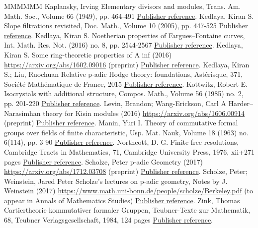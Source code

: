 \begin{thebibliography}{MMMMMM}
 Kaplansky, Irving Elementary divisors and modules, Trans. Am. Math. Soc., Volume 66 (1949), pp. 464-491 \href{https://ahl.centre-mersenne.org/item/AHL_2019__2__415_0/#Ka66}{Publisher reference}.
 Kedlaya, Kiran S. Slope filtrations revisited, Doc. Math., Volume 10 (2005), pp. 447-525 \href{https://ahl.centre-mersenne.org/item/AHL_2019__2__415_0/#Ke05}{Publisher reference}.
 Kedlaya, Kiran S. Noetherian properties of Fargues–Fontaine curves, Int. Math. Res. Not. (2016) no. 8, pp. 2544-2567 \href{https://ahl.centre-mersenne.org/item/AHL_2019__2__415_0/#Ke16}{Publisher reference}.
 Kedlaya, Kiran S. Some ring-theoretic properties of A inf  (2016) \url{https://arxiv.org/abs/1602.09016} (preprint) \href{https://ahl.centre-mersenne.org/item/AHL_2019__2__415_0/#Ke16b}{Publisher reference}.
 Kedlaya, Kiran S.; Liu, Ruochuan Relative p-adic Hodge theory: foundations, Astérisque, 371, Société Mathématique de France, 2015 \href{https://ahl.centre-mersenne.org/item/AHL_2019__2__415_0/#KeLi15}{Publisher reference}.
 Kottwitz, Robert E. Isocrystals with additional structure, Compos. Math., Volume 56 (1985) no. 2, pp. 201-220 \href{https://ahl.centre-mersenne.org/item/AHL_2019__2__415_0/#Ko85}{Publisher reference}.
 Levin, Brandon; Wang-Erickson, Carl A Harder–Narasimhan theory for Kisin modules (2016) \url{https://arxiv.org/abs/1606.00914} (preprint) \href{https://ahl.centre-mersenne.org/item/AHL_2019__2__415_0/#LeWE16}{Publisher reference}.
 Manin, Yuri I. Theory of commutative formal groups over fields of finite characteristic, Usp. Mat. Nauk, Volume 18 (1963) no. 6(114), pp. 3-90 \href{https://ahl.centre-mersenne.org/item/AHL_2019__2__415_0/#Ma63}{Publisher reference}.
 Northcott, D. G. Finite free resolutions, Cambridge Tracts in Mathematics, 71, Cambridge University Press, 1976, xii+271 pages \href{https://ahl.centre-mersenne.org/item/AHL_2019__2__415_0/#No76}{Publisher reference}.
 Scholze, Peter p-adic Geometry (2017) \url{https://arxiv.org/abs/1712.03708} (preprint) \href{https://ahl.centre-mersenne.org/item/AHL_2019__2__415_0/#Sc17}{Publisher reference}.
 Scholze, Peter; Weinstein, Jared Peter Scholze’s lectures on p-adic geometry, Notes by J. Weinstein (2017) \url{https://www.math.uni-bonn.de/people/scholze/Berkeley.pdf} (to appear in Annals of Mathematics Studies) \href{https://ahl.centre-mersenne.org/item/AHL_2019__2__415_0/#ScWe15}{Publisher reference}.
 Zink, Thomas Cartiertheorie kommutativer formaler Gruppen, Teubner-Texte zur Mathematik, 68, Teubner Verlagsgesellschaft, 1984, 124 pages \href{https://ahl.centre-mersenne.org/item/AHL_2019__2__415_0/#Zi84}{Publisher reference}.
\end{thebibliography}
